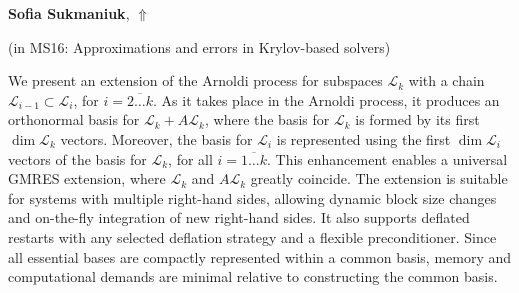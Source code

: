 \documentclass[ILAS2025-program.tex]{subfiles}
\begin{document}
\hypertarget{down0387}{}\begin{ilasabstract}
    
\textbf{Sofia Sukmaniuk},  \hfill \hyperlink{up0387}{$\Uparrow$}
    
    
(in {\color{mstitle}MS16: Approximations and errors in Krylov-based solvers})
        
\mtskip
    We present an extension of the Arnoldi process for subspaces \({\mathcal L}_k\) with a chain \({\mathcal L}_{i-1} \subset {\mathcal L}_i\), for \(i = \overline{2 \dots k}\). As it takes place in the Arnoldi process, it produces an orthonormal basis for \({\mathcal L}_k + A {\mathcal L}_k\), where the basis for \({\mathcal L}_k\) is formed by its first \(\dim {\mathcal L}_k\) vectors. Moreover, the basis for \({\mathcal L}_i\) is represented using the first \(\dim {\mathcal L}_i\) vectors of the basis for \({\mathcal L}_k\), for all \(i = \overline{1 \dots k}\). This enhancement enables a universal GMRES extension, where ${\mathcal L}_k$ and $A{\mathcal L}_k$ greatly coincide.  The extension is suitable for systems with multiple right-hand sides, allowing dynamic block size changes and on-the-fly integration of new right-hand sides. It also supports deflated restarts with any selected deflation strategy and a flexible preconditioner. Since all essential bases are compactly represented within a common basis, memory and computational demands are minimal relative to constructing the common basis.


 

\end{ilasabstract}
    
\end{document}
